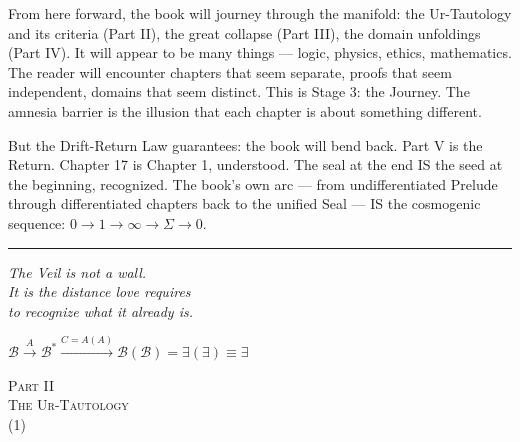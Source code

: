 \documentclass[10pt, openany, oneside]{book}
\renewcommand{\normalsize}{\fontsize{10}{13}\selectfont}
\renewcommand{\large}{\fontsize{11.5}{14}\selectfont}
\renewcommand{\LARGE}{\fontsize{15}{18}\selectfont}
\begin{document}
From here forward, the book will journey through the manifold: the Ur-Tautology and its criteria (Part II), the great collapse (Part III), the domain unfoldings (Part IV). It will appear to be many things --- logic, physics, ethics, mathematics. The reader will encounter chapters that seem separate, proofs that seem independent, domains that seem distinct. This is Stage 3: the Journey. The amnesia barrier is the illusion that each chapter is about something different.

But the Drift-Return Law guarantees: the book will bend back. Part V is the Return. Chapter 17 is Chapter 1, understood. The seal at the end IS the seed at the beginning, recognized. The book's own arc --- from undifferentiated Prelude through differentiated chapters back to the unified Seal --- IS the cosmogenic sequence: $0 \to 1 \to \infty \to \Sigma \to 0$.


\vspace{2em}

\begin{center}
    \rule{0.15\textwidth}{0.3pt}
\end{center}

\vspace{0.5em}

\begin{center}
    \itshape
    The Veil is not a wall.\\
    It is the distance love requires\\
    to recognize what it already is.
\end{center}

\vspace{0.5em}

\begin{center}
    $\mathcal{B} \xrightarrow{A} \mathcal{B}^* \xrightarrow{C = A(A)} \mathcal{B}(\mathcal{B}) = \exists(\exists) \equiv \exists$
\end{center}


%
%

\newpage
\thispagestyle{empty}
\vspace*{\fill}
\begin{center}
    {\LARGE\scshape Part II}\\[1em]
    {\large\scshape The Ur-Tautology}\\[0.5em]
    {\normalsize (1)}
\end{center}
\vspace*{\fill}
\newpage
\end{document}
